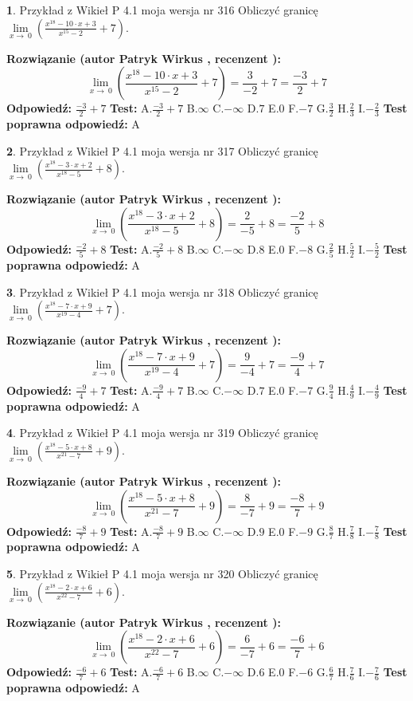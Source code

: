 \documentclass[12pt, a4paper]{article}
\theoremstyle{definition} %
\newtheorem{zad}{}
\newcommand{\zadStart}[1]{\begin{zad}#1\newline}
\newcommand{\zadStop}{\end{zad}}
\newcommand{\rozwStart}[2]{\noindent \textbf{Rozwiązanie (autor #1 , recenzent #2): }\newline}
\newcommand{\rozwStop}{\newline}
\newcommand{\odpStart}{\noindent \textbf{Odpowiedź:}\newline}
\newcommand{\odpStop}{\newline}
\newcommand{\testStart}{\noindent \textbf{Test:}\newline}
\newcommand{\testStop}{\newline}
\newcommand{\kluczStart}{\noindent \textbf{Test poprawna odpowiedź:}\newline}
\newcommand{\kluczStop}{\newline}
\begin{document}
\zadStart{Przykład z Wikieł P 4.1 moja wersja nr 316}
Obliczyć granicę $\lim\limits_{x\to\ 0}(\frac{x^{18}-10 \cdot x +3}{x^{15}-2}+7)$.
\zadStop
\rozwStart{Patryk Wirkus}{}
$$\lim\limits_{x\to\ 0}(\frac{x^{18}-10 \cdot x +3}{x^{15}-2}+7)=\frac{3}{-2}+7=\frac{-3}{2}+7$$
\rozwStop
\odpStart
$\frac{-3}{2}+7$
\odpStop
\testStart
A.$\frac{-3}{2}+7$
B.$\infty$
C.$-\infty$
D.$7$
E.$0$
F.$-7$
G.$\frac{3}{2}$
H.$\frac{2}{3}$
I.$-\frac{2}{3}$
\testStop
\kluczStart
A
\kluczStop



\zadStart{Przykład z Wikieł P 4.1 moja wersja nr 317}
Obliczyć granicę $\lim\limits_{x\to\ 0}(\frac{x^{18}-3 \cdot x +2}{x^{18}-5}+8)$.
\zadStop
\rozwStart{Patryk Wirkus}{}
$$\lim\limits_{x\to\ 0}(\frac{x^{18}-3 \cdot x +2}{x^{18}-5}+8)=\frac{2}{-5}+8=\frac{-2}{5}+8$$
\rozwStop
\odpStart
$\frac{-2}{5}+8$
\odpStop
\testStart
A.$\frac{-2}{5}+8$
B.$\infty$
C.$-\infty$
D.$8$
E.$0$
F.$-8$
G.$\frac{2}{5}$
H.$\frac{5}{2}$
I.$-\frac{5}{2}$
\testStop
\kluczStart
A
\kluczStop



\zadStart{Przykład z Wikieł P 4.1 moja wersja nr 318}
Obliczyć granicę $\lim\limits_{x\to\ 0}(\frac{x^{18}-7 \cdot x +9}{x^{19}-4}+7)$.
\zadStop
\rozwStart{Patryk Wirkus}{}
$$\lim\limits_{x\to\ 0}(\frac{x^{18}-7 \cdot x +9}{x^{19}-4}+7)=\frac{9}{-4}+7=\frac{-9}{4}+7$$
\rozwStop
\odpStart
$\frac{-9}{4}+7$
\odpStop
\testStart
A.$\frac{-9}{4}+7$
B.$\infty$
C.$-\infty$
D.$7$
E.$0$
F.$-7$
G.$\frac{9}{4}$
H.$\frac{4}{9}$
I.$-\frac{4}{9}$
\testStop
\kluczStart
A
\kluczStop



\zadStart{Przykład z Wikieł P 4.1 moja wersja nr 319}
Obliczyć granicę $\lim\limits_{x\to\ 0}(\frac{x^{18}-5 \cdot x +8}{x^{21}-7}+9)$.
\zadStop
\rozwStart{Patryk Wirkus}{}
$$\lim\limits_{x\to\ 0}(\frac{x^{18}-5 \cdot x +8}{x^{21}-7}+9)=\frac{8}{-7}+9=\frac{-8}{7}+9$$
\rozwStop
\odpStart
$\frac{-8}{7}+9$
\odpStop
\testStart
A.$\frac{-8}{7}+9$
B.$\infty$
C.$-\infty$
D.$9$
E.$0$
F.$-9$
G.$\frac{8}{7}$
H.$\frac{7}{8}$
I.$-\frac{7}{8}$
\testStop
\kluczStart
A
\kluczStop



\zadStart{Przykład z Wikieł P 4.1 moja wersja nr 320}
Obliczyć granicę $\lim\limits_{x\to\ 0}(\frac{x^{18}-2 \cdot x +6}{x^{22}-7}+6)$.
\zadStop
\rozwStart{Patryk Wirkus}{}
$$\lim\limits_{x\to\ 0}(\frac{x^{18}-2 \cdot x +6}{x^{22}-7}+6)=\frac{6}{-7}+6=\frac{-6}{7}+6$$
\rozwStop
\odpStart
$\frac{-6}{7}+6$
\odpStop
\testStart
A.$\frac{-6}{7}+6$
B.$\infty$
C.$-\infty$
D.$6$
E.$0$
F.$-6$
G.$\frac{6}{7}$
H.$\frac{7}{6}$
I.$-\frac{7}{6}$
\testStop
\kluczStart
A
\kluczStop
\end{document}
